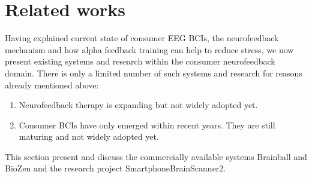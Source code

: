 \documentclass[a4paper,10pt,english,lof,lot,twoside]{puthesis}
\begin{document}
\section{Related works}
\label{ch-background/index:related-works}\label{ch-background/index:sec-related-works}
Having explained current state of consumer EEG BCIs, the neurofeedback mechanism
and how alpha feedback training can help to reduce stress, we now present
existing systems and research within the consumer neurofeedback domain. There is
only a limited number of such systems and research for reasons already mentioned
above:
\begin{enumerate}
\item {} 
Neurofeedback therapy is expanding but not widely adopted yet.

\item {} 
Consumer BCIs have only emerged within recent years. They are still maturing and not
widely adopted yet.

\end{enumerate}

This section present and discuss the commercially available systems
Brainball and BioZen and the research project SmartphoneBrainScanner2.
\end{document}
